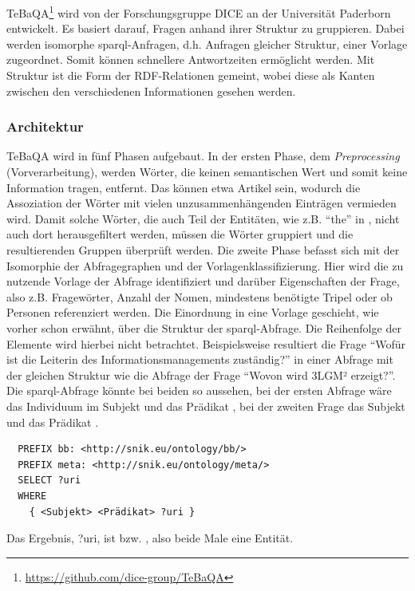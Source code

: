 TeBaQA\footnote{\url{https://github.com/dice-group/TeBaQA}} \citep{tebaqa} wird von der Forschungsgruppe DICE an der Universität Paderborn entwickelt.
Es basiert darauf, Fragen anhand ihrer Struktur zu gruppieren.
Dabei werden isomorphe \ac{sparql}-Anfragen, d.h. Anfragen gleicher Struktur, einer Vorlage zugeordnet.
Somit können schnellere Antwortzeiten ermöglicht werden.
Mit Struktur ist die Form der RDF-Relationen gemeint, wobei diese als Kanten zwischen den verschiedenen Informationen gesehen werden.

\subsubsection{Architektur}

TeBaQA wird in fünf Phasen aufgebaut.
In der ersten Phase, dem \emph{Preprocessing} (Vorverarbeitung), werden Wörter, die keinen semantischen Wert und somit keine Information tragen, entfernt.
Das können etwa Artikel sein, wodurch die Assoziation der Wörter mit vielen unzusammenhängenden Einträgen vermieden wird.
Damit solche Wörter, die auch Teil der Entitäten, wie z.B. \enquote{the} in ,
nicht auch dort herausgefiltert werden, müssen die Wörter gruppiert und die resultierenden Gruppen überprüft werden.
Die zweite Phase befasst sich mit der Isomorphie der Abfragegraphen und der Vorlagenklassifizierung.
Hier wird die zu nutzende Vorlage der Abfrage identifiziert und darüber Eigenschaften der Frage, also z.B. Fragewörter,
Anzahl der Nomen, mindestens benötigte Tripel oder ob Personen referenziert werden.
Die Einordnung in eine Vorlage geschieht, wie vorher schon erwähnt, über die Struktur der \ac{sparql}-Abfrage.
Die Reihenfolge der Elemente wird hierbei nicht betrachtet.
Beispielsweise resultiert die Frage \enquote{Wofür ist die Leiterin des Informationsmanagements zuständig?}
in einer Abfrage mit der gleichen Struktur wie die Abfrage der Frage \enquote{Wovon wird 3LGM² erzeigt?}.
Die \ac{sparql}-Abfrage könnte bei beiden so aussehen, bei der ersten Abfrage wäre das Individuum im Subjekt  und das Prädikat ,
bei der zweiten Frage das Subjekt  und das Prädikat .
\begin{lstlisting}
  PREFIX bb: <http://snik.eu/ontology/bb/>
  PREFIX meta: <http://snik.eu/ontology/meta/>
  SELECT ?uri
  WHERE
    { <Subjekt> <Prädikat> ?uri }
\end{lstlisting}
Das Ergebnis, ?uri, ist  bzw. , also beide Male eine Entität.
